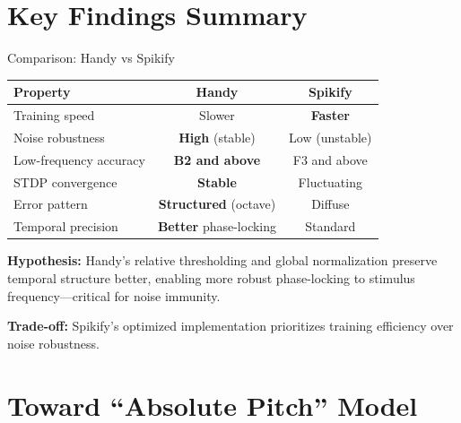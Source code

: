 \documentclass[aspectratio=169,20pt]{beamer}
\begin{document}
\section{Key Findings Summary}

\begin{frame}{Comparison: Handy vs Spikify}
\begin{center}
\begin{tabular}{lcc}
\toprule
\textbf{Property} & \textbf{Handy} & \textbf{Spikify} \\
\midrule
Training speed & Slower & \textbf{Faster} \\
Noise robustness & \textbf{High} (stable) & Low (unstable) \\
Low-frequency accuracy & \textbf{B2 and above} & F3 and above \\
STDP convergence & \textbf{Stable} & Fluctuating \\
Error pattern & \textbf{Structured} (octave) & Diffuse \\
Temporal precision & \textbf{Better} phase-locking & Standard \\
\bottomrule
\end{tabular}
\end{center}

\vspace{0.4cm}
\textbf{Hypothesis:} Handy's relative thresholding and global normalization preserve temporal structure better, enabling more robust phase-locking to stimulus frequency---critical for noise immunity.

\vspace{0.3cm}
\textbf{Trade-off:} Spikify's optimized implementation prioritizes training efficiency over noise robustness.
\end{frame}


\section{Toward ``Absolute Pitch'' Model}
\end{document}
